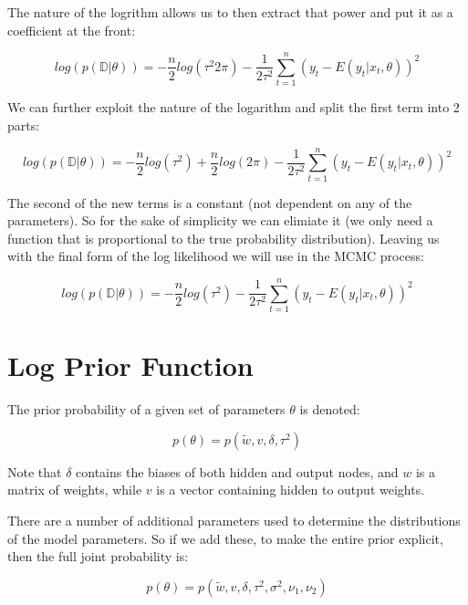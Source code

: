 \documentclass[12pt,a4paper]{article}
\numberwithin{equation}{section}
\begin{document}
The nature of the logrithm allows us to then extract that power and put it as a coefficient at the front:

\begin{equation}
log(p(\mathbb{D} | \theta)) = - \frac{n}{2} log(\tau^2 2\pi) - \frac{1}{2\tau^2} \sum_{t=1}^n (y_t - E(y_t|x_t,\theta))^2
\end{equation}

We can further exploit the nature of the logarithm and split the first term into 2 parts:

\begin{equation}
log(p(\mathbb{D} | \theta)) = - \frac{n}{2} log(\tau^2) + \frac{n}{2} log(2\pi)  - \frac{1}{2\tau^2} \sum_{t=1}^n (y_t - E(y_t|x_t,\theta))^2
\end{equation}

The second of the new terms is a constant (not dependent on any of the parameters). 
So for the sake of simplicity we can elimiate it (we only need a function that is proportional to the true probability distribution).
Leaving us with the final form of the log likelihood we will use in the MCMC process:

\begin{equation}
log(p(\mathbb{D} | \theta)) = - \frac{n}{2} log(\tau^2) - \frac{1}{2\tau^2} \sum_{t=1}^n (y_t - E(y_t|x_t,\theta))^2
\end{equation}


\section{Log Prior Function}

The prior probability of a given set of parameters $\theta$ is denoted:

\begin{equation}
p(\theta) = p(\tilde{w}, v, \delta, \tau^2)
\end{equation}

Note that $\delta$ contains the biases of both hidden and output nodes, and $w$ is a matrix of weights, 
while $v$ is a vector containing hidden to output weights.

There are a number of additional parameters used to determine the distributions of the model parameters.
So if we add these, to make the entire prior explicit, then the full joint probability is:

\begin{equation}
p(\theta) = p(\tilde{w}, v, \delta, \tau^2, \sigma^2, \nu_1, \nu_2)
\end{equation}
\end{document}
